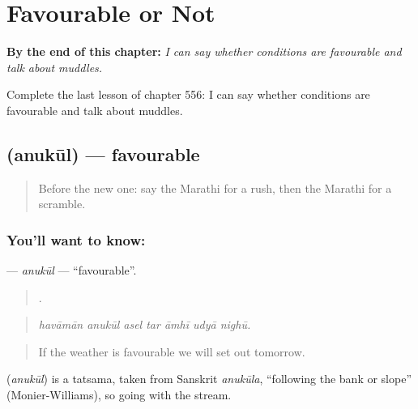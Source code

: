 
\chapter{Favourable or Not}
\label{ch:mr-favourable-or-not}

\begin{chapteropening}
\textbf{By the end of this chapter:} \emph{I can say whether conditions are favourable and talk about muddles.}

Complete the last lesson of chapter 556: I can say whether conditions are favourable and talk about muddles.
\end{chapteropening}

\section[\texorpdfstring{\mr{अनुकूल} (anukūl)}{अनुकूल (anukūl)}]{ (anukūl) — favourable}

\label{lesson:MR-C556-anukul}



\begin{quote}
Before the new one: say the Marathi for a rush, then the Marathi for a scramble.
\end{quote}

\subsection*{You'll want to know: }
\textbf{} — \emph{anukūl} — \textquotedblleft{}favourable\textquotedblright{}.

\begin{quote}
      .
\end{quote}

\begin{quote}
\emph{havāmān anukūl asel tar āmhī udyā nighū.}
\end{quote}

\begin{quote}
If the weather is favourable we will set out tomorrow.
\end{quote}

\begin{cousinweb}
\textbf{} (\emph{anukūl}) is a tatsama, taken from Sanskrit \emph{anukūla}, \textquotedblleft{}following the bank or slope\textquotedblright{} (Monier-Williams), so going with the stream.
\end{cousinweb}

